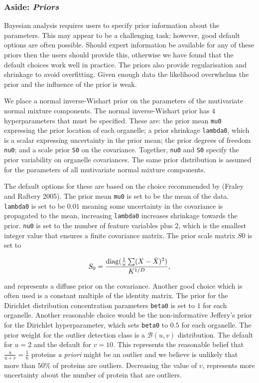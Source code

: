 \documentclass[]{article}
\begin{document}
\subsubsection*{\texorpdfstring{Aside:
\emph{Priors}}{Aside: Priors}}\label{aside-priors}

Bayesian analysis requires users to specify prior information about the
parameters. This may appear to be a challenging task; however, good
default options are often possible. Should expert information be
available for any of these priors then the users should provide this,
otherwise we have found that the default choices work well in practice.
The priors also provide regularisation and shrinkage to avoid
overfitting. Given enough data the likelihood overwhelms the prior and
the influence of the prior is weak.

We place a normal inverse-Wishart prior on the parameters of the
mutivariate normal mixture components. The normal inverse-Wishart prior
has \(4\) hyperparameters that must be specified. These are: the prior
mean \texttt{mu0} expressing the prior location of each organelle; a
prior shrinkage \texttt{lambda0}, which is a scalar expressing
uncertainty in the prior mean; the prior degrees of freedom
\texttt{nu0}; and a scale prior \texttt{S0} on the covariance. Together,
\texttt{nu0} and \texttt{S0} specify the prior variability on organelle
covariances. The same prior distribution is assumed for the parameters
of all mutivariate normal mixture components.

The default options for these are based on the choice recommended by
(Fraley and Raftery 2005). The prior mean \texttt{mu0} is set to be the
mean of the data. \texttt{lambda0} is set to be \(0.01\) meaning some
uncertainty in the covariance is propagated to the mean, increasing
\texttt{lambda0} increases shrinkage towards the prior. \texttt{nu0} is
set to the number of feature variables plus \(2\), which is the smallest
integer value that ensures a finite covariance matrix. The prior scale
matrix \(S0\) is set to

\begin{equation}
S_0 = \frac{\mathop{\mathrm{diag}}(\frac{1}{n}\sum (X - \bar{X})^2)}{K^{1/D}},
\end{equation}

and represents a diffuse prior on the covariance. Another good choice
which is often used is a constant multiple of the identity matrix. The
prior for the Dirichlet distribution concentration parameters
\texttt{beta0} is set to \(1\) for each organelle. Another reasonable
choice would be the non-informative Jeffery's prior for the Dirichlet
hyperparameter, which sets \texttt{beta0} to \(0.5\) for each organelle.
The prior weight for the outlier detection class is a
\(\mathcal{B}(u, v)\) distribution. The default for \(u = 2\) and the
default for \(v = 10\). This represents the reasonable belief that
\(\frac{u}{u + v} = \frac{1}{6}\) proteins \emph{a priori} might be an
outlier and we believe is unlikely that more than \(50\%\) of proteins
are outliers. Decreasing the value of \(v\), represents more uncertainty
about the number of protein that are outliers.
\end{document}
